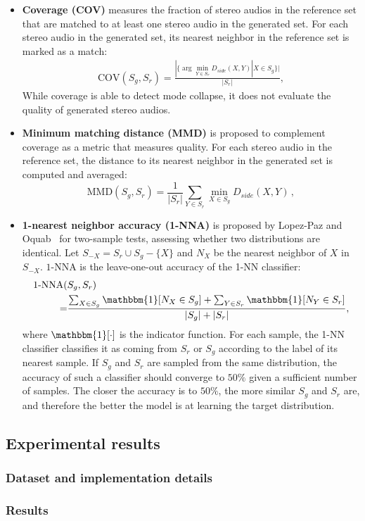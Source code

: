 \begin{itemize}
	\item\textbf{Coverage (COV)} measures the fraction of stereo audios in the reference set that are matched to at least one stereo audio in the generated set. For each stereo audio in the generated set, its nearest neighbor in the reference set is marked as a match:
	\begin{align*}
	\text{COV}(S_g, S_r) = \frac{|\{\arg\min_{Y \in S_r} D_{side}(X,Y) | X \in S_g \}|}{|S_r|},
	\end{align*}
	While coverage is able to detect mode collapse, it does not evaluate the quality of generated stereo audios. 
	\item\textbf{Minimum matching distance (MMD)} is proposed to complement coverage as a metric that measures quality. For each stereo audio in the reference set, the distance to its nearest neighbor in the generated set is computed and averaged:
	\begin{equation}
	\text{MMD}(S_g, S_r) = \frac{1}{|S_r|}\sum_{Y\in S_r} \min_{X\in S_g} D_{side}(X,Y)\,,\nonumber
	\end{equation}
	
	\item \textbf{1-nearest neighbor accuracy (1-NNA)} is proposed by Lopez-Paz and Oquab~\cite{1-nna} for two-sample tests, assessing whether two distributions are identical.
	Let $S_{-X} = S_r \cup S_g - \{X\}$ and $N_X$ be the nearest neighbor of $X$ in $S_{-X}$. $1$-NNA is the leave-one-out accuracy of the 1-NN classifier:
	\begin{align*}
	\text{1-NNA}(&S_g, S_r) \\
	=&\frac{\sum_{X\in S_g} \mathbbm{1}[N_X \in S_g] +  \sum_{Y\in S_r} \mathbbm{1}[N_Y \in S_r]}{|S_g|+|S_r|} ,
	\end{align*}
	where $\mathbbm{1}[\cdot]$ is the indicator function.
	For each sample, the 1-NN classifier classifies it as coming from $S_r$ or $S_g$ according to the label of its nearest sample.
	If $S_g$ and $S_r$ are sampled from the same distribution, the accuracy of such a classifier should converge to $50\%$ given a sufficient number of samples. The closer the accuracy is to $50\%$, the more similar $S_g$ and $S_r$ are, and therefore the better the model is at learning the target distribution.
\end{itemize}

\subsection{Experimental results}
\label{subsec:result}
\subsubsection{Dataset and implementation details}
\label{subsubsec:dataset}

\subsubsection{Results}
\label{subsubsec:result}
